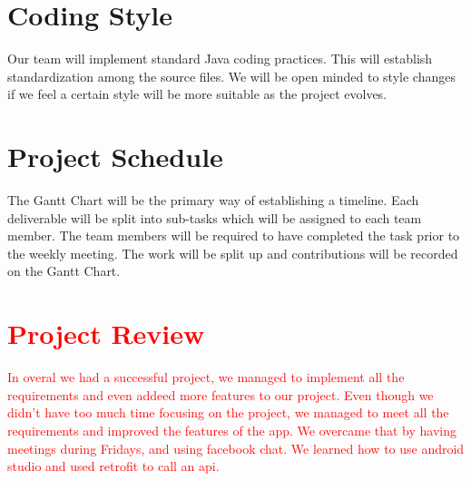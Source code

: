 \documentclass{article}
\begin{document}
\section{Coding Style}
Our team will implement standard Java coding practices. This will establish standardization among the source files. We will be open minded to style changes if we feel a certain style will be more suitable as the project evolves.

\section{Project Schedule}
The Gantt Chart will be the primary way of establishing a timeline. Each deliverable will be split into sub-tasks which will be assigned to each team member. The team members will be required to have completed the task prior to the weekly meeting. The work will be split up and contributions will be recorded on the Gantt Chart.



\section{\textcolor{red}{Project Review}}
\textcolor{red}{In overal we had a successful project, we managed to implement all the requirements and even addeed more features to our project. Even though we didn't have too much time focusing on the project, we managed to meet all the requirements and improved the features of the app. We overcame that by having meetings during Fridays, and using facebook chat. We learned how to use android studio and used retrofit to call an api.}
\end{document}
